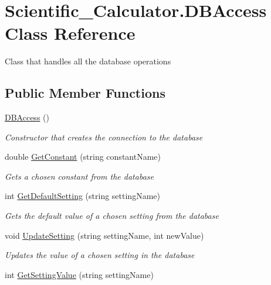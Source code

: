 \hypertarget{class_scientific___calculator_1_1_d_b_access}{}\section{Scientific\+\_\+\+Calculator.\+D\+B\+Access Class Reference}
\label{class_scientific___calculator_1_1_d_b_access}


Class that handles all the database operations  


\subsection*{Public Member Functions}
\begin{DoxyCompactItemize}
\item 
\hyperlink{class_scientific___calculator_1_1_d_b_access_a6007d654070f5893e1876c19e1740a5c}{D\+B\+Access} ()
\begin{DoxyCompactList}\small\item\em Constructor that creates the connection to the database \end{DoxyCompactList}\item 
double \hyperlink{class_scientific___calculator_1_1_d_b_access_a55b2251a50067b4008e03b911770cdf7}{Get\+Constant} (string constant\+Name)
\begin{DoxyCompactList}\small\item\em Gets a chosen constant from the database \end{DoxyCompactList}\item 
int \hyperlink{class_scientific___calculator_1_1_d_b_access_a2b2a68c2a113ee7f4dabde92b4675d7e}{Get\+Default\+Setting} (string setting\+Name)
\begin{DoxyCompactList}\small\item\em Gets the default value of a chosen setting from the database \end{DoxyCompactList}\item 
void \hyperlink{class_scientific___calculator_1_1_d_b_access_a3ada18c0a3a5a48dd7b88b166b715c7d}{Update\+Setting} (string setting\+Name, int new\+Value)
\begin{DoxyCompactList}\small\item\em Updates the value of a chosen setting in the database \end{DoxyCompactList}\item 
int \hyperlink{class_scientific___calculator_1_1_d_b_access_a738341bafa087495fe4c940ef3c74517}{Get\+Setting\+Value} (string setting\+Name)

\end{DoxyCompactItemize}
